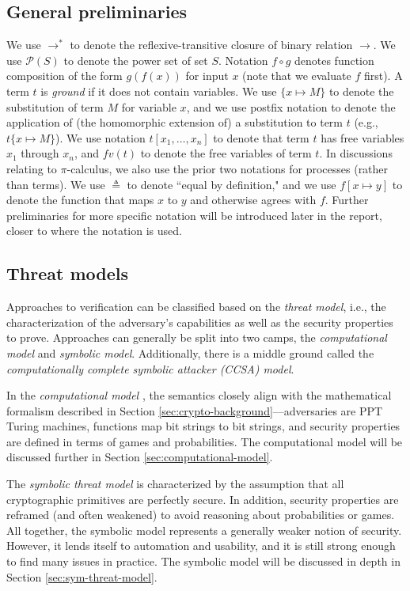 \documentclass{article}
\theoremstyle{definition}
\begin{document}
\subsection{General preliminaries}
We use $\rightarrow^*$ to denote the reflexive-transitive closure of binary relation $\rightarrow$. 
We use $\mathcal{P}(S)$ to denote the power set of set $S$. 
Notation $f \circ g$ denotes function composition of the form $g(f(x))$ for input $x$ 
(note that we evaluate $f$ first). 
A term $t$ is \textit{ground} if it does not contain variables. 
We use $\{x \mapsto M\}$ to denote the substitution of term $M$ for variable $x$, 
and we use postfix notation to denote the application of (the homomorphic extension of) a substitution 
to term $t$ (e.g., $t\{x \mapsto M\}$). 
We use notation $t[x_1, \dots, x_n]$ to denote that term $t$ has free variables $x_1$ through $x_n$, 
and $\mathit{fv}(t)$ to denote the free variables of term $t$. 
In discussions relating to $\pi$-calculus, we also use the prior two notations for processes (rather than terms). 
We use $\triangleq$ to denote ``equal by definition," 
and we use $f[x \mapsto y]$ to denote the function 
that maps $x$ to $y$ and otherwise agrees with $f$. 
Further preliminaries for more specific notation will be introduced later in the report, 
closer to where the notation is used. 

\subsection{Threat models} Approaches to verification can be classified based on the \textit{threat model}, 
i.e., the characterization of the adversary's capabilities as well as the security properties to prove. 
Approaches can generally be split into two camps, 
the \textit{computational model} and \textit{symbolic model}. 
Additionally, there is a middle ground called the \textit{computationally complete symbolic attacker (CCSA) model}.

In the \textit{computational model} \cite{computational_model}, the semantics closely align with the mathematical formalism 
described in Section \ref{sec:crypto-background}---adversaries are PPT Turing machines, 
functions map bit strings to bit strings, 
and security properties are defined in terms of games and probabilities. 
The computational model will be discussed further in Section \ref{sec:computational-model}.

The \textit{symbolic threat model} \cite{dolev_yao} is characterized by the assumption that all cryptographic primitives 
are perfectly secure. In addition, security properties are reframed (and often weakened) 
to avoid reasoning about probabilities or games. 
All together, the symbolic model represents a generally weaker notion of security. 
However, it lends itself to automation and usability, and it is still strong enough to find many issues in practice. 
The symbolic model will be discussed in depth in Section \ref{sec:sym-threat-model}.
\end{document}
